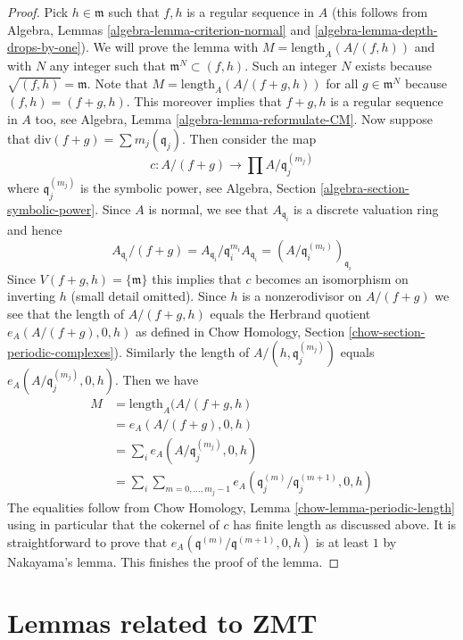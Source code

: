 \begin{proof}
Pick $h \in \mathfrak m$ such that $f, h$ is a regular sequence in $A$
(this follows from Algebra, Lemmas \ref{algebra-lemma-criterion-normal} and
\ref{algebra-lemma-depth-drops-by-one}).
We will prove the lemma with $M = \text{length}_A(A/(f, h))$ and with
$N$ any integer such that $\mathfrak m^N \subset (f, h)$. Such
an integer $N$ exists because $\sqrt{(f, h)} = \mathfrak m$. Note that
$M = \text{length}_A(A/(f + g, h))$ for all $g \in \mathfrak m^N$
because $(f, h) = (f + g, h)$. This moreover implies that $f + g, h$
is a regular sequence in $A$ too, see
Algebra, Lemma \ref{algebra-lemma-reformulate-CM}.
Now suppose that $\text{div}(f + g ) = \sum m_j (\mathfrak q_j)$.
Then consider the map
$$
c : A/(f + g) \longrightarrow \prod A/\mathfrak q_j^{(m_j)}
$$
where $\mathfrak q_j^{(m_j)}$ is the symbolic power, see
Algebra, Section \ref{algebra-section-symbolic-power}.
Since $A$ is normal, we see that $A_{\mathfrak q_i}$ is
a discrete valuation ring and hence
$$
A_{\mathfrak q_i}/(f + g) =
A_{\mathfrak q_i}/\mathfrak q_i^{m_i} A_{\mathfrak q_i} =
(A/\mathfrak q_i^{(m_i)})_{\mathfrak q_i}
$$
Since $V(f + g, h) = \{\mathfrak m\}$ this implies that $c$ becomes
an isomorphism on inverting $h$ (small detail omitted). Since $h$ is a
nonzerodivisor on $A/(f + g)$ we see that the length of $A/(f + g, h)$
equals the Herbrand quotient $e_A(A/(f + g), 0, h)$
as defined in Chow Homology, Section
\ref{chow-section-periodic-complexes}).
Similarly the length of $A/(h, \mathfrak q_j^{(m_j)})$ equals
$e_A(A/\mathfrak q_j^{(m_j)}, 0, h)$. Then we have
\begin{align*}
M & = \text{length}_A(A/(f + g, h) \\
& =
e_A(A/(f + g), 0, h) \\
& =
\sum\nolimits_i e_A(A/\mathfrak q_j^{(m_j)}, 0, h) \\
& =
\sum\nolimits_i \sum\nolimits_{m = 0, \ldots, m_j - 1}
e_A(\mathfrak q_j^{(m)}/\mathfrak q_j^{(m + 1)}, 0, h)
\end{align*}
The equalities follow from Chow Homology, Lemma
\ref{chow-lemma-periodic-length} using in particular that
the cokernel of $c$ has finite length as discussed above.
It is straightforward to prove that
$e_A(\mathfrak q^{(m)}/\mathfrak q^{(m + 1)}, 0, h)$
is at least $1$ by Nakayama's lemma. This finishes the proof of the lemma.
\end{proof}



\section{Lemmas related to ZMT}
\label{section-ZMT}

